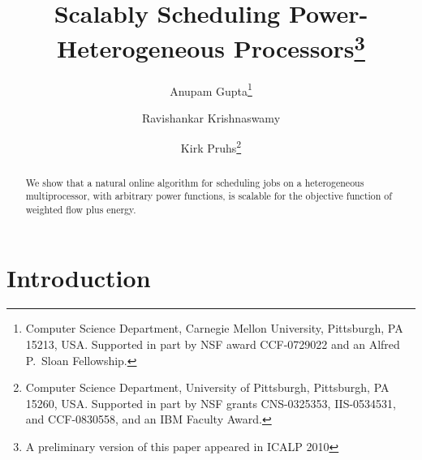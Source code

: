 \documentclass[11pt]{article}
\begin{document}
\title{Scalably Scheduling Power-Heterogeneous Processors\footnote{A preliminary version of this paper appeared in ICALP 2010}}

\author{
 Anupam Gupta\thanks{ Computer Science Department, Carnegie Mellon
    University, Pittsburgh, PA 15213, USA. 
Supported in part by
     NSF award CCF-0729022 and an Alfred P.~Sloan
     Fellowship.}
 \and Ravishankar Krishnaswamy
\and Kirk Pruhs\thanks{Computer Science Department,
University of Pittsburgh, Pittsburgh, PA 15260, USA. 
Supported in part by
 NSF grants CNS-0325353, IIS-0534531, and CCF-0830558, and
 an IBM Faculty Award.}
 }

\date{}
\maketitle


\begin{abstract}
  We show that a natural online algorithm for scheduling jobs on a
  heterogeneous multiprocessor, with arbitrary power functions, is
  scalable for the objective function of weighted flow plus energy.
\end{abstract}

\section{Introduction}
\label{sec:introduction}
\end{document}
